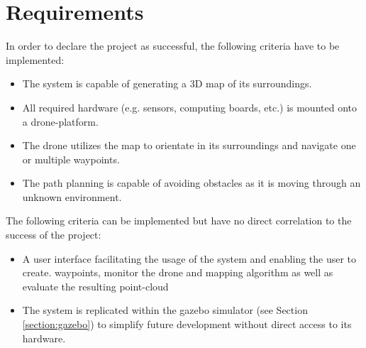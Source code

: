 \section{Requirements}
In order to declare the project as successful, the following criteria have to be implemented:
\begin{itemize}
	\item The system is capable of generating a 3D map of its surroundings.
	\item All required hardware (e.g. sensors, computing boards, etc.) is mounted onto a drone-platform.
	\item The drone utilizes the map to orientate in its surroundings and navigate one or multiple waypoints.
	\item The path planning is capable of avoiding obstacles as it is moving through an unknown environment.
\end{itemize}

The following criteria can be implemented but have no direct correlation to the success of the project:
\begin{itemize}
	\item A user interface facilitating the usage of the system and enabling the user to create. waypoints, monitor the drone and mapping algorithm as well as evaluate the resulting point-cloud
	\item The system is replicated within the gazebo simulator (see Section \ref{section:gazebo}) to simplify future development without direct access to its hardware.
\end{itemize} 


\filbreak
